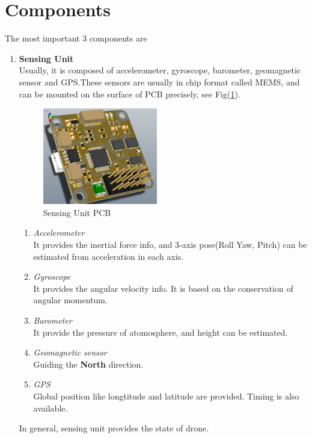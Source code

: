\documentclass[paper=a4, fontsize=11pt]{scrartcl} %
\numberwithin{equation}{section} %
\numberwithin{figure}{section} %
\numberwithin{table}{section} %
\begin{document}
\section{Components}
	The most important 3 components are
	\begin{enumerate}
		\item \textbf{Sensing Unit}\\
			Usually, it is composed of accelerometer, gyroscope, barometer, geomagnetic sensor and GPS.These sensors are usually in chip format called MEMS, and can be mounted on the surface of PCB precisely, see Fig(\ref{fig:imu_pcb}).\\
			
			\begin{figure}[!h]
				\centering
				\includegraphics[width=5cm]{pic/imu.png}
				\caption{Sensing Unit PCB}
				\label{fig:imu_pcb}
			\end{figure}
			
			\begin{enumerate}
				\item \textit{Accelerometer}\\
					It provides the inertial force info, and 3-axis pose(Roll Yaw, Pitch) can be estimated from acceleration in each axis.
				\item \textit{Gyroscope}\\
					It provides the angular velocity info. It is based on the conservation of angular momentum.
				\item \textit{Barometer}\\
					It provide the pressure of atomosphere, and height can be estimated.
				\item \textit{Geomagnetic sensor}\\
					Guiding the \textbf{North} direction.
				\item \textit{GPS}\\
					Global position like longtitude and latitude are provided. Timing is also available.
			\end{enumerate}
		
			In general, sensing unit provides the state of drone. 
		

\end{enumerate}
\end{document}
